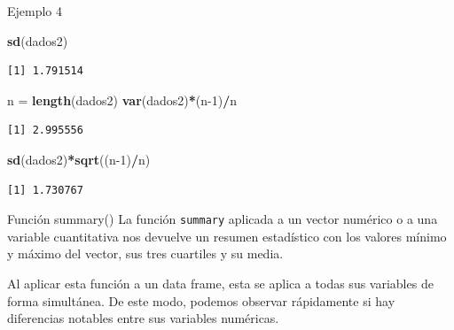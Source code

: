 \documentclass[
  ignorenonframetext,
  aspectratio=169]{beamer}
\newenvironment{Shaded}{\begin{snugshade}}{\end{snugshade}}
\newcommand{\DecValTok}[1]{\textcolor[rgb]{0.00,0.00,0.81}{#1}}
\newcommand{\FunctionTok}[1]{\textcolor[rgb]{0.13,0.29,0.53}{\textbf{#1}}}
\newcommand{\NormalTok}[1]{#1}
\newcommand{\OtherTok}[1]{\textcolor[rgb]{0.56,0.35,0.01}{#1}}
\newcommand{\SpecialCharTok}[1]{\textcolor[rgb]{0.81,0.36,0.00}{\textbf{#1}}}
\begin{document}
\begin{frame}[fragile]{Ejemplo 4}
\label{ejemplo-4-10}
\begin{Shaded}
\begin{Highlighting}[]
\FunctionTok{sd}\NormalTok{(dados2)}
\end{Highlighting}
\end{Shaded}

\begin{verbatim}
[1] 1.791514
\end{verbatim}

\begin{Shaded}
\begin{Highlighting}[]
\NormalTok{n }\OtherTok{=} \FunctionTok{length}\NormalTok{(dados2)}
\FunctionTok{var}\NormalTok{(dados2)}\SpecialCharTok{*}\NormalTok{(n}\DecValTok{{-}1}\NormalTok{)}\SpecialCharTok{/}\NormalTok{n}
\end{Highlighting}
\end{Shaded}

\begin{verbatim}
[1] 2.995556
\end{verbatim}

\begin{Shaded}
\begin{Highlighting}[]
\FunctionTok{sd}\NormalTok{(dados2)}\SpecialCharTok{*}\FunctionTok{sqrt}\NormalTok{((n}\DecValTok{{-}1}\NormalTok{)}\SpecialCharTok{/}\NormalTok{n)}
\end{Highlighting}
\end{Shaded}

\begin{verbatim}
[1] 1.730767
\end{verbatim}
\end{frame}

\begin{frame}[fragile]{Función summary()}
\label{funciuxf3n-summary}
La función \texttt{summary} aplicada a un vector numérico o a una
variable cuantitativa nos devuelve un resumen estadístico con los
valores mínimo y máximo del vector, sus tres cuartiles y su media.

Al aplicar esta función a un data frame, esta se aplica a todas sus
variables de forma simultánea. De este modo, podemos observar
rápidamente si hay diferencias notables entre sus variables numéricas.
\end{frame}
\end{document}
